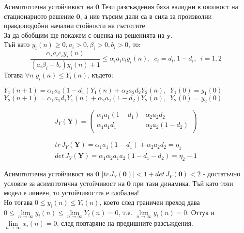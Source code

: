 \begin{frame}[t]{Асимптотична устойчивост на $\mathbf{0}$}
Тези разсъждения бяха валидни в околност на стационарното решение $\mathbf{0}$, а ние търсим дали са в сила за произволни правдоподобни начални стойности на гъстотите. \\
За да обобщим ще покажем с оценка на решенията на $\mathbf{y}$. \\
Тъй като $y_{i}(n) \geq 0, a_{i} > 0, \beta_{i} > 0, b_{i}>0$, то: 
\[\frac{\alpha_{i} a_{i} c_{i} y_{i}(n)}{(a_{i} \beta_{i} + b_{i}) y_{i}(n) + 1} \leq
\alpha_{i} a_{i} c_{i} y_{i}(n),\enspace c_{i}=d_{i},1-d_{i}, \enspace i=1,2\]
Тогава $\forall{n} \; y_{i}(n) \leq Y_{i}(n)$, където:

$Y_{1}(n+1)=\alpha_{1} a_{1} (1-d_{1}) Y_{1}(n) + \alpha_{2} a_{2} d_{2} Y_{2}(n), \enspace Y_{1}(0)=y_{1}(0)$ \\
$Y_{2}(n+1)=\alpha_{1} a_{1} d_{1} Y_{1}(n) + 
\alpha_{2} a_{2} (1-d_{2}) Y_{2}(n), \enspace Y_{2}(0)=y_{2}(0)$

\[J_{Y}(\mathbf{Y})=\left(
\begin{array}{cc}
 \alpha_{1} a_{1} (1-d_{1}) & \alpha_{2} a_{2} d_{2} 
 \\
 \alpha_{1} a_{1} d_{1} & \alpha_{2} a_{2} (1-d_{2})
 \\
\end{array}
\right)\]


\[\begin{array}{c}
tr \, J_{Y}(\mathbf{Y}) = \alpha_{1} a_{1} (1-d_{1}) + \alpha_{2} a_{2} d_{2} = \eta_{1}  \\
det \, J_{Y}(\mathbf{Y}) = \alpha_{1} \alpha_{2} a_{1} a_{2} (1 - d_{1} - d_{2}) = \eta_{2} - 1
\end{array}\]

\end{frame}

\begin{frame}[t]{Асимптотична устойчивост на $\mathbf{0}$}
$\lvert tr \, J_{Y}(\mathbf{0}) \rvert < 1 + det \, J_{Y}(\mathbf{0}) < 2$ - достатъчно условие за асимптотична устойчивост на $\mathbf{0}$ при тази динамика. Тъй като този модел е линеен, то устойчивостта е \underline{глобална}! \\
Но тогава $0 \leq y_{i}(n) \leq Y_{i}(n)$, което след граничен преход дава $0 \leq \lim\limits_{n \to \infty}y_{i}(n) \leq \lim\limits_{n \to \infty}Y_{i}(n)=0$, т.е. $\lim\limits_{n \to \infty}y_{i}(n)=0$. Оттук и $\lim\limits_{n \to \infty}x_{i}(n)=0$, след повтаряне на предишните разсъждения.

\end{frame}